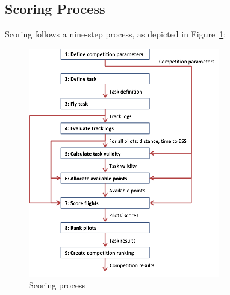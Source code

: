 \documentclass{article}
\begin{document}
\subsection{Scoring Process}
Scoring follows a nine-step process, as depicted in
Figure~\ref{fig:scoring-process}:

\begin{figure}[h!]
    \centering
    \includegraphics[scale=0.7]{img/scoring-process.png}
    \caption{Scoring process}
    \label{fig:scoring-process}
\end{figure}
\end{document}
